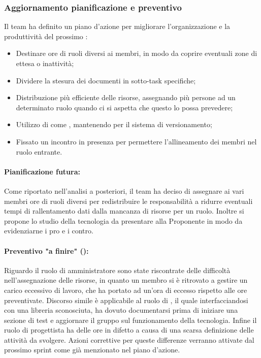 \subsubsection{Aggiornamento pianificazione e preventivo}
\par Il team ha definito un piano d'azione per migliorare l'organizzazione e la produttività del prossimo :
\begin{itemize}
  \item Destinare ore di ruoli diversi ai membri, in modo da coprire eventuali zone di ettesa o inattività;
  \item Dividere la stesura dei documenti in sotto-task specifiche;
  \item Distribuzione più efficiente delle risorse, assegnando più persone ad un determinato ruolo quando ci si aspetta che questo lo possa prevedere;
  \item Utilizzo di  come , mantenendo  per il sistema di versionamento;
  \item Fissato un incontro in presenza per permettere l'allineamento dei membri nel ruolo entrante.
\end{itemize}

\paragraph*{Pianificazione futura:}
\par Come riportato nell'analisi a posteriori, il team ha deciso di assegnare ai vari membri ore di ruoli diversi per redistribuire le responsabilità a ridurre eventuali tempi di rallentamento dati dalla mancanza di risorse per un ruolo. Inoltre si propone lo studio della tecnologia  da presentare alla Proponente in modo da evidenziarne i pro e i contro.

\paragraph*{Preventivo "a finire" ():}
\par Riguardo il ruolo di amministratore sono state riscontrate delle difficoltà nell'assegnazione delle risorse, in quanto un membro si è ritrovato a gestire un carico eccessivo di lavoro, che ha portato ad un'ora di eccesso rispetto alle ore preventivate. Discorso simile è applicabile al ruolo di \Programmatore{}, il quale interfacciandosi con una libreria sconosciuta, ha dovuto documentarsi prima di iniziare una sezione di test e aggiornare il gruppo sul funzionamento della tecnologia. Infine il ruolo di progettista ha delle ore in difetto a causa di una scarsa definizione delle attività da svolgere. Azioni correttive per queste differenze verranno attivate dal prossimo sprint come già menzionato nel piano d'azione.

